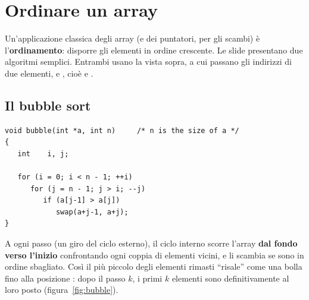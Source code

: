 \section{Ordinare un array}

Un'applicazione classica degli array (e dei puntatori, per gli scambi) è
l'\textbf{ordinamento}: disporre gli elementi in ordine crescente. Le
slide presentano due algoritmi semplici. Entrambi usano la  vista
sopra, a cui passano gli indirizzi di due elementi,  e
, cioè  e .

\subsection{Il bubble sort}

\begin{affianco}[0.55][c]
\begin{lstlisting}[style=c, name=bubblesort.c]
void bubble(int *a, int n)     /* n is the size of a */
{
   int    i, j;

   for (i = 0; i < n - 1; ++i)
      for (j = n - 1; j > i; --j)
         if (a[j-1] > a[j])
            swap(a+j-1, a+j);
}
\end{lstlisting}
\risultato
{}
\end{affianco}

A ogni passo (un giro del ciclo esterno), il ciclo interno scorre l'array
\textbf{dal fondo verso l'inizio} confrontando ogni coppia di elementi
vicini, e li scambia se sono in ordine sbagliato. Così il più piccolo degli
elementi rimasti “risale” come una bolla fino alla posizione :
dopo il passo $k$, i primi $k$ elementi sono definitivamente al loro posto
(figura~\ref{fig:bubble}).

